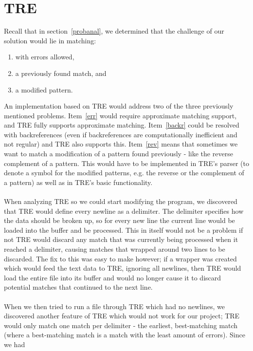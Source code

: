 \section{TRE}\label{tre}
Recall that in section~\ref{probanal}, we determined that the challenge of our 
solution would lie in matching:
\begin{enumerate}
\item \label{err} with errors allowed,
\item \label{backr} a previously found match, and 
\item \label{rev} a modified pattern.
\end{enumerate}
An implementation based on TRE would address two of the three previously mentioned 
problems. Item~\ref{err} would require approximate matching support, and 
TRE fully supports approximate matching. Item~\ref{backr} could be resolved 
with backreferences (even if backreferences are computationally inefficient and not regular) 
and TRE also supports this. Item~\ref{rev} means that sometimes we want to 
match a modification of a pattern found previously - like the reverse 
complement of a pattern. This would have to be implemented in TRE's parser 
(to denote a symbol for the modified patterns, e.g. the reverse or the 
complement of a pattern) as 
well as in TRE's basic functionality.\\\\
When analyzing TRE so we could start modifying the 
program, we discovered that TRE would define every newline as a delimiter. The 
delimiter specifies how the data should be broken up, so for every new line 
the current line would be loaded into the buffer and be processed. This in 
itself would not be a problem if not TRE would discard any match that 
was currently being processed when it reached a delimiter, causing matches that 
wrapped around two lines to be discarded. The fix to this was easy to make 
however; if a wrapper was created which would feed the text data to TRE, 
ignoring all newlines, then TRE would load the entire file into its buffer 
and would no longer cause it to discard potential matches that continued to 
the next line.\\\\
When we then tried to run a file through TRE which had no newlines, we discovered 
another feature of TRE which would not work for our project; TRE would only 
match one match per delimiter - the earliest, best-matching match (where a 
best-matching match is a match with the least amount of errors). Since we had 

